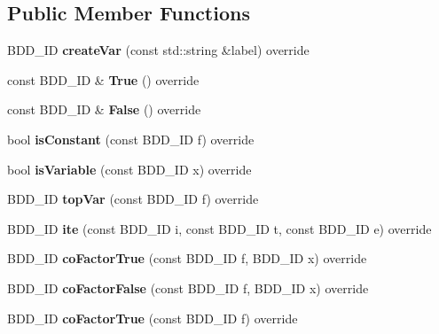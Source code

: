 \subsection*{Public Member Functions}
\begin{DoxyCompactItemize}
\item 
B\+D\+D\+\_\+\+ID {\bfseries create\+Var} (const std\+::string \&label) override\label{classClassProject_1_1Manager_aa3fe08b0b002032a13a5ff9d05f39cfd}

\item 
const B\+D\+D\+\_\+\+ID \& {\bfseries True} () override\label{classClassProject_1_1Manager_a7229b49af4aebfd32af558a18e17e243}

\item 
const B\+D\+D\+\_\+\+ID \& {\bfseries False} () override\label{classClassProject_1_1Manager_a699638a290747c865312b4c130260a06}

\item 
bool {\bfseries is\+Constant} (const B\+D\+D\+\_\+\+ID f) override\label{classClassProject_1_1Manager_a13edef310f5e0ea718619151a7be451a}

\item 
bool {\bfseries is\+Variable} (const B\+D\+D\+\_\+\+ID x) override\label{classClassProject_1_1Manager_a84c7144dc3c74e39dfb50a053da626a0}

\item 
B\+D\+D\+\_\+\+ID {\bfseries top\+Var} (const B\+D\+D\+\_\+\+ID f) override\label{classClassProject_1_1Manager_a07c655db284e0f8c169563adbed8801b}

\item 
B\+D\+D\+\_\+\+ID {\bfseries ite} (const B\+D\+D\+\_\+\+ID i, const B\+D\+D\+\_\+\+ID t, const B\+D\+D\+\_\+\+ID e) override\label{classClassProject_1_1Manager_a615943b56ed99f812d4117ebb5bbc455}

\item 
B\+D\+D\+\_\+\+ID {\bfseries co\+Factor\+True} (const B\+D\+D\+\_\+\+ID f, B\+D\+D\+\_\+\+ID x) override\label{classClassProject_1_1Manager_ae58b05ca4ddd764390db56a1e22e7b07}

\item 
B\+D\+D\+\_\+\+ID {\bfseries co\+Factor\+False} (const B\+D\+D\+\_\+\+ID f, B\+D\+D\+\_\+\+ID x) override\label{classClassProject_1_1Manager_a91b0f680c53a9813e11f590f99c21264}

\item 
B\+D\+D\+\_\+\+ID {\bfseries co\+Factor\+True} (const B\+D\+D\+\_\+\+ID f) override\label{classClassProject_1_1Manager_abc6417257171d6032a7dee6ea2ecd8d3}


\end{DoxyCompactItemize}
